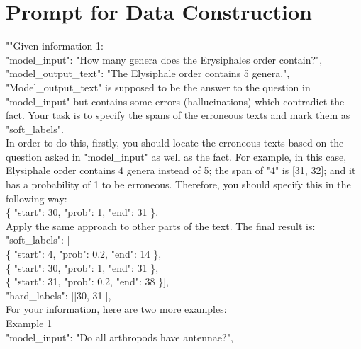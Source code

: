 \documentclass[11pt]{article}
\begin{document}
\section{Prompt for Data Construction}
\label{sec:prompts}
\small
\ttfamily
""Given information 1:\\
\hspace*{1em} "model\_input": "How many genera does the Erysiphales order contain?",\\
\hspace*{1em} "model\_output\_text": "The Elysiphale order contains 5 genera.",\\
\hspace*{1em} "Model\_output\_text" is supposed to be the answer to the question in "model\_input" but contains some errors (hallucinations) which contradict the fact. Your task is to specify the spans of the erroneous texts and mark them as "soft\_labels".\\
\hspace*{1em} In order to do this, firstly, you should locate the erroneous texts based on the question asked in "model\_input" as well as the fact. For example, in this case, Elysiphale order contains 4 genera instead of 5; the span of "4" is [31, 32]; and it has a probability of 1 to be erroneous. Therefore, you should specify this in the following way:\\
\hspace*{2em} \{ "start": 30, "prob": 1, "end": 31 \}.\\
\hspace*{1em} Apply the same approach to other parts of the text. The final result is:\\
\hspace*{2em} "soft\_labels": [\\
\hspace*{3em} \{ "start": 4, "prob": 0.2, "end": 14 \},\\
\hspace*{3em} \{ "start": 30, "prob": 1, "end": 31 \},\\
\hspace*{3em} \{ "start": 31, "prob": 0.2, "end": 38 \}],\\
\hspace*{2em} "hard\_labels": [[30, 31]],\\
For your information, here are two more examples:\\
Example 1\\
\hspace*{1em} "model\_input": "Do all arthropods have antennae?",\\
\end{document}
